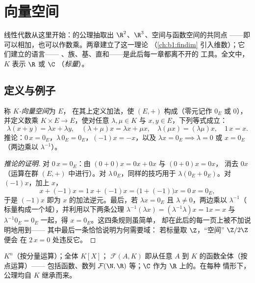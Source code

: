 \chapter{向量空间}\label{ch:b1:vspaces}

线性代数从这里开始：的公理抽取出
$\R^2$、$\R^3$、空间与函数空间的共同点
——即可以相加，也可以作数乘。两章建立了这一理论
（\cref{ch:b1:findim} 引入维数）；它们建立的语言——
、族、基、直和——是此后每一章都离不开的
工具。全文中，$K$ 表示 $\R$ 或 $\C$
（\emph{标量}）。

\section{定义与例子}

\begin{definition}[向量空间]\label{def:b1:vspaces:def}
称 \emph{$K$-向量空间}为 $E$，
在其上定义加法，使 $(E, +)$ 构成（零元记作 $0_E$ 或
$0$），并定义数乘 $K \times E \to E$，使对任意
$\lambda, \mu \in K$ 与 $x, y \in E$，下列等式成立：
\[
\lambda(x + y) = \lambda x + \lambda y,\quad
(\lambda + \mu) x = \lambda x + \mu x,\quad
\lambda(\mu x) = (\lambda\mu) x,\quad
1\,x = x .
\]
推论：$0\,x = 0_E$，$\lambda\,0_E = 0_E$，$(-1)x = -x$，以及
$\lambda x = 0_E \implies \lambda = 0$ 或 $x = 0_E$（两边乘以
$\lambda^{-1}$）。
\end{definition}

\begin{proof}[推论的证明]
对 $0\,x = 0_E$：由 $(0 + 0)x = 0x + 0x$ 与 $(0+0)x = 0x$，
消去 $0x$（运算在群 $(E, +)$ 中进行）。对 $\lambda\,0_E$，同样的技巧用于
$\lambda(0_E + 0_E)$。对 $(-1)x$，加上 $x$，
\[
x + (-1)x = 1\,x + (-1)x = \bigl(1 + (-1)\bigr)x = 0\,x = 0_E ,
\]
于是 $(-1)x$ 即为 $x$ 的加法逆元。最后，若 $\lambda x
= 0_E$ 且 $\lambda \neq 0$，两边乘以 $\lambda^{-1}$（
标量构成一个域），并利用以下两条公理
$\lambda^{-1}(\lambda x) = (\lambda^{-1}\lambda)x = 1x = x$
与 $\lambda^{-1}0_E = 0_E$ 一起，得 $x = 0_E$。这四条规则虽简单，
却在此后的每一页上被不加说明地用到——
其中最后一条恰恰说明为何需要域：
若标量取 $\Z$，“空间” $\Z/2\Z$ 便会
在 $2\,x = 0$ 处违反它。
\end{proof}

\begin{example}\label{ex:b1:vspaces:examples}
$K^n$（按分量运算）；全体 $K[X]$；
$\mathcal{F}(A, K)$ 即从任意 $A$ 到 $K$ 的函数全体（按点运算）——
包括函数、数列
$\mathcal{F}(\N, \R)$ 等；$\C$ 作为 $\R$ 上的。在每种
情形下，公理均自 $K$ 继承而来。
\end{example}

